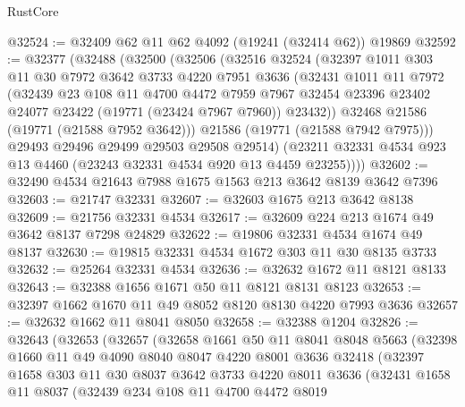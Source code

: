 \begin{lexlean}{RustCore}
\begin{coremodule}
@32524 := @32409 @62 @11 @62 @4092 (@19241 (@32414 @62)) @19869
@32592 := @32377
    (@32488
      (@32500
        (@32506
          (@32516
            @32524
            (@32397
              @1011
              @303
              @11
              @30
              @7972
              @3642
              @3733
              @4220
              @7951
              @3636
              (@32431
                @1011
                @11
                @7972
                (@32439
                  @23
                  @108
                  @11
                  @4700
                  @4472
                  @7959
                  @7967
                  @32454
                  @23396
                  @23402
                  @24077
                  @23422
                  (@19771 (@23424 @7967 @7960))
                  @23432))
              @32468
              @21586
              (@19771 (@21588 @7952 @3642)))
            @21586
            (@19771 (@21588 @7942 @7975)))
          @29493
          @29496
          @29499
          @29503
          @29508
          @29514)
        (@23211 @32331 @4534 @923 @13 @4460 (@23243 @32331 @4534 @920 @13 @4459 @23255))))
@32602 := @32490 @4534 @21643 @7988 @1675 @1563 @213 @3642 @8139 @3642 @7396
@32603 := @21747 @32331
@32607 := @32603 @1675 @213 @3642 @8138
@32609 := @21756 @32331 @4534
@32617 := @32609 @224 @213 @1674 @49 @3642 @8137 @7298 @24829
@32622 := @19806 @32331 @4534 @1674 @49 @8137
@32630 := @19815 @32331 @4534 @1672 @303 @11 @30 @8135 @3733
@32632 := @25264 @32331 @4534
@32636 := @32632 @1672 @11 @8121 @8133
@32643 := @32388 @1656 @1671 @50 @11 @8121 @8131 @8123
@32653 := @32397 @1662 @1670 @11 @49 @8052 @8120 @8130 @4220 @7993 @3636
@32657 := @32632 @1662 @11 @8041 @8050
@32658 := @32388 @1204
@32826 := @32643
    (@32653
      (@32657
        (@32658
          @1661
          @50
          @11
          @8041
          @8048
          @5663
          (@32398
            @1660
            @11
            @49
            @4090
            @8040
            @8047
            @4220
            @8001
            @3636
            @32418
            (@32397
              @1658
              @303
              @11
              @30
              @8037
              @3642
              @3733
              @4220
              @8011
              @3636
              (@32431
                @1658
                @11
                @8037
                (@32439
                  @234
                  @108
                  @11
                  @4700
                  @4472
                  @8019

\end{coremodule}
\end{lexlean}
